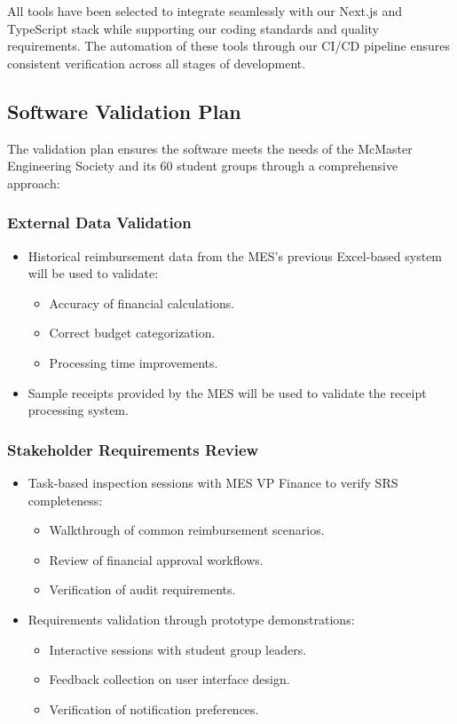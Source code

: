 \documentclass[12pt, titlepage]{article}
\begin{document}
All tools have been selected to integrate seamlessly with our Next.js and TypeScript stack while supporting our coding standards and quality requirements. The automation of these tools through our CI/CD pipeline ensures consistent verification across all stages of development.

\subsection{Software Validation Plan}
The validation plan ensures the software meets the needs of the McMaster Engineering Society and its 60 student groups through a comprehensive approach:
\subsubsection*{External Data Validation}
\begin{itemize}
   \item Historical reimbursement data from the MES's previous Excel-based system will be used to validate:
   \begin{itemize}
       \item Accuracy of financial calculations.
       \item Correct budget categorization.
       \item Processing time improvements.
   \end{itemize}
   \item Sample receipts provided by the MES will be used to validate the receipt processing system.
\end{itemize}

\subsubsection*{Stakeholder Requirements Review}
\begin{itemize}
   \item Task-based inspection sessions with MES VP Finance to verify SRS completeness:
   \begin{itemize}
       \item Walkthrough of common reimbursement scenarios.
       \item Review of financial approval workflows.
       \item Verification of audit requirements.
   \end{itemize}
   \item Requirements validation through prototype demonstrations:
   \begin{itemize}
       \item Interactive sessions with student group leaders.
       \item Feedback collection on user interface design.
       \item Verification of notification preferences.
   \end{itemize}
\end{itemize}
\end{document}
